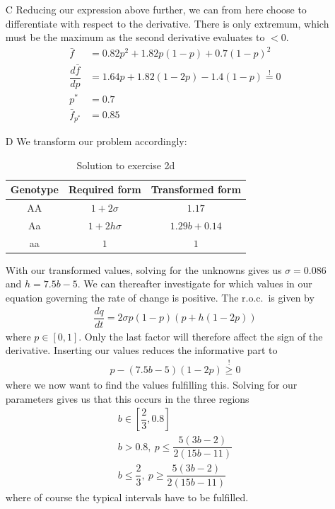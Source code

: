 \documentclass[10pt]{article}\usepackage[]{graphicx}\usepackage[]{color}
\theoremstyle{plain}
\begin{document}
\begin{multicols*}{2}
\begin{enumerate}
  \item[C] 
    Reducing our expression above further, we can from here choose to
    differentiate with respect to the derivative. There is only extremum, which
    must be the maximum as the second derivative evaluates to $<0$.
    \begin{align*}
      \bar f &= 0.82p^2 + 1.82p(1-p) +
      0.7(1-p)^2 \\
      \dfrac{d\bar f}{dp} &= 1.64p + 1.82(1-2p) -
      1.4(1-p) \stackrel{!}{=} 0 \\
      p^* &= 0.7 \\
      \bar f_{p^*} &= 0.85
    \end{align*}
  \item[D] We transform our problem accordingly:
  \begin{table}[H]
     \centering
     \caption{Solution to exercise 2d}\label{tab:exc2d}
     \begin{tabular}{ccc}
       \toprule
       Genotype & Required form & Transformed form\\
       \midrule
     AA & $1 + 2\sigma$   & $1.17$ \\
     Aa & $1 + 2h\sigma$  & $1.29b + 0.14$ \\
     aa & $1$             & $1$ \\\bottomrule
     \end{tabular}
   \end{table}
   With our transformed values, solving for the unknowns gives us $\sigma = 0.086$ and $h = 7.5b - 5$. We can thereafter investigate for which values in our equation governing the rate of change is positive. The r.o.c.\ is given by 
   \begin{align*}
    \dfrac{dq}{dt} = 2\sigma p(1-p)(p + h(1-2p))
   \end{align*}
   where $p \in \left[0, 1\right]$. Only the last factor will therefore affect the sign of the derivative. Inserting our values reduces the informative part to
   \begin{align*}
      p - (7.5b - 5)(1 - 2p) \stackrel{!}{\geq} 0 
   \end{align*}
   where we now want to find the values fulfilling this. Solving for our parameters gives us that this occurs in the three regions    \begin{gather*}
      b \in [\dfrac{2}{3}, 0.8] \\
      b > 0.8,\ p \leq \dfrac{5(3b-2)}{2(15b-11)} \\
      b \leq \dfrac{2}{3},\ p \geq \dfrac{5(3b-2)}{2(15b-11)}
   \end{gather*}
   where of course the typical intervals have to be fulfilled. 


\end{enumerate}
\end{multicols*}
\end{document}

